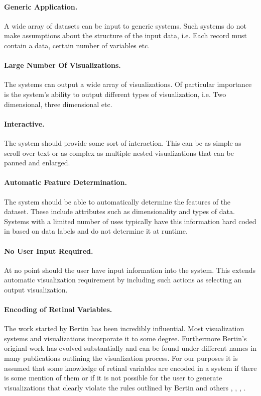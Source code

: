\documentclass[a4paper, 11pt, titlepage, onehalfspacing]{report}
\begin{document}
\paragraph{Generic Application.} A wide array of datasets can be input to generic systems. Such systems do not make assumptions about the structure of the input data, i.e. Each record must contain a data, certain number of variables etc.

\paragraph{Large Number Of Visualizations.} The systems can output a wide array of visualizations. Of particular importance is the system's ability to output different types of visualization, i.e. Two dimensional, three dimensional etc.

\paragraph{Interactive.} The system should provide some sort of interaction. This can be as simple as scroll over text or as complex as multiple nested visualizations that can be panned and enlarged. 

\paragraph{Automatic Feature Determination.} The system should be able to automatically determine the features of the dataset. These include attributes such as dimensionality and types of data. Systems with a limited number of uses typically have this information hard coded in based on data labels and do not determine it at runtime.

\paragraph{No User Input Required.} At no point should the user have input information into the system. This extends automatic visualization requirement by including such actions as selecting an output visualization.

\paragraph{Encoding of Retinal Variables.}
The work started by Bertin \cite{bertin1973semiologie} has been incredibly influential. Most visualization systems and visualizations incorporate it to some degree. Furthermore Bertin's original work has evolved substantially and can be found under different names in many publications outlining the visualization process. For our purposes it is assumed that some knowledge of retinal variables are encoded in a system if there is some mention of them or if it is not possible for the user to generate visualizations that clearly violate the rules outlined by Bertin and others \cite{card1999readings}, \cite{mazza2009introduction}, \cite{spence2001information}, \cite{cleveland1984graphical}. 
\end{document}

